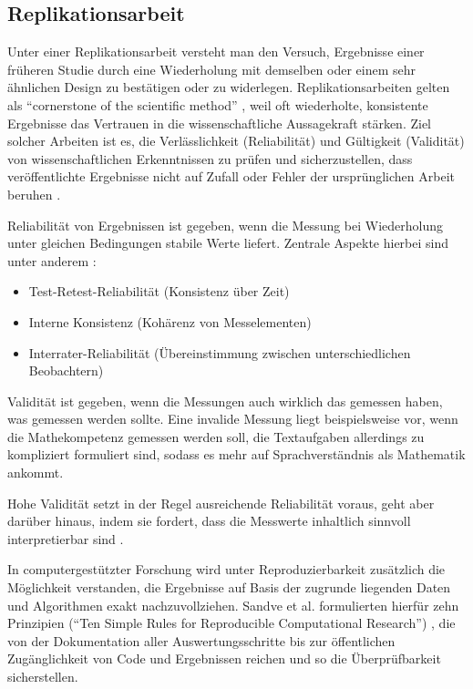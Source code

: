 \subsection{Replikationsarbeit}\label{chap:replikationsarbeit}

Unter einer Replikationsarbeit versteht man den Versuch, Ergebnisse einer früheren Studie durch eine Wiederholung mit demselben oder einem sehr ähnlichen Design zu bestätigen oder zu widerlegen. Replikationsarbeiten gelten als \enquote{cornerstone of the scientific method} \cite{simons-2014}, weil oft wiederholte, konsistente Ergebnisse das Vertrauen in die wissenschaftliche Aussagekraft stärken.
Ziel solcher Arbeiten ist es, die Verlässlichkeit (Reliabilität) und Gültigkeit (Validität) von wissenschaftlichen Erkenntnissen zu prüfen und sicherzustellen, dass veröffentlichte Ergebnisse nicht auf Zufall oder Fehler der ursprünglichen Arbeit beruhen \cite{sciences-2019}.

Reliabilität von Ergebnissen ist gegeben, wenn die Messung bei Wiederholung unter gleichen Bedingungen stabile Werte liefert. Zentrale Aspekte hierbei sind unter anderem \cite{middleton-2022}:

\begin{itemize}
  \item Test-Retest-Reliabilität (Konsistenz über Zeit)
  \item Interne Konsistenz (Kohärenz von Messelementen)
  \item Interrater-Reliabilität (Übereinstimmung zwischen unterschiedlichen Beobachtern)
\end{itemize}

Validität ist gegeben, wenn die Messungen auch wirklich das gemessen haben, was gemessen werden sollte. Eine invalide Messung liegt beispielsweise vor, wenn die Mathekompetenz gemessen werden soll, die Textaufgaben allerdings zu kompliziert formuliert sind, sodass es mehr auf Sprachverständnis als Mathematik ankommt.

Hohe Validität setzt in der Regel ausreichende Reliabilität voraus, geht aber darüber hinaus, indem sie fordert, dass die Messwerte inhaltlich sinnvoll interpretierbar sind \cite{chiang-2015}.

In computergestützter Forschung wird unter Reproduzierbarkeit zusätzlich die Möglichkeit verstanden, die Ergebnisse auf Basis der zugrunde liegenden Daten und Algorithmen exakt nachzuvollziehen. Sandve et al. formulierten hierfür zehn Prinzipien (\enquote{Ten Simple Rules for Reproducible Computational Research}) \cite{sandve-2013}, die von der Dokumentation aller Auswertungsschritte bis zur öffentlichen Zugänglichkeit von Code und Ergebnissen reichen und so die Überprüfbarkeit sicherstellen.



